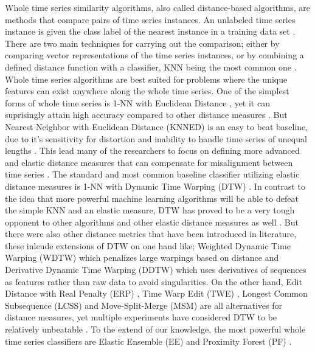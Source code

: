 Whole time series similarity algorithms, also called distance-based algorithms, are methods that compare pairs of time series instances.
An unlabeled time series instance is given the class label of the nearest instance in a training data set \cite{kate2016using}.
There are two main techniques for carrying out the comparison;
either by comparing vector representations of the time series instances,
or by combining a defined distance function with a classifier, KNN being the most common one \cite{lines2018time}.
Whole time series algorithms are best suited for problems where the unique features can exist anywhere along the whole time series\cite{bagnall2017great}.\newline
One of the simplest forms of whole time series is 1-NN with Euclidean Distance \cite{faloutsos1994fast}, yet it can suprisingly attain high accuracy compared to other distance measures \cite{xing2010brief}.
But Nearest Neighbor with Euclidean Distance (KNNED) is an easy to beat baseline, due to it's sensitivity for distortion and inability to handle time series of unequal lengths \cite{xing2010brief,kate2016using,lines2018time}.
This lead many of the researchers to focus on defining more advanced and elastic distance measures that can compensate for misalignment between time series \cite{abanda2019review}.
The standard and most common baseline classifier utilizing elastic distance measures is 1-NN with Dynamic Time Warping (DTW) \cite{bagnall2017great}.
In contrast to the idea that more powerful machine learning algorithms will be able to defeat the simple KNN and an elastic measure,
DTW has proved to be a very tough opponent to other algorithms and other elastic distance measures as well \cite{kate2016using,lines2015time,wang2013experimental}.
But there were also other distance metrics that have been introduced in literature, these inlcude extensions of DTW on one hand like; Weighted Dynamic Time Warping (WDTW) which penalizes large warpings based on distance \cite{jeong2011weighted}
and Derivative Dynamic Time Warping (DDTW) \cite{keogh2001derivative,gorecki2013using} which uses derivatives of sequences as features rather than raw data to avoid singularities.
On the other hand, Edit Distance with Real Penalty (ERP) \cite{chen2004marriage}, Time Warp Edit (TWE) \cite{marteau2008time}, Longest Common Subsequence (LCSS) \cite{das1997finding} and Move-Split-Merge (MSM) \cite{stefan2012move}
are all alternatives for distance measures, yet multiple experiments have considered DTW to be relatively unbeatable \cite{bagnall2017great,abanda2019review,bostrom2017shapelet}.
To the extend of our knowledge, the most powerful whole time series classifiers are Elastic Ensemble (EE) \cite{lines2015time} and Proximity Forest (PF) \cite{lucas2019proximity}.\newline